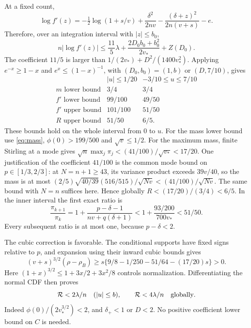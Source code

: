 \documentclass[11pt]{article}
\begin{document}
At a fixed count,
\[
\log f'(z)=-\tfrac12\log(1+s/v)+\frac{\delta^2}{2nv}
                  -\frac{(\delta+z)^2}{2n(v+s)}-e.
\]
Therefore, over an integration interval with $|z|\le b_0$,
\[
n|\log f'(z)|\le\frac{11}{5}\lambda+
             \frac{2D_0b_0+b_0^2}{2v_*}+Z(D_0).
\]
The coefficient $11/5$ is larger than
$1/(2v_*)+D^2/(1400v_*^2)$. Applying $e^{-x}\ge1-x$ and
$e^x\le(1-x)^{-1}$, with $(D_0,b_0)=(1,b)$ or $(D,7/10)$,
gives
\[
\begin{array}{c|cc}
 &|u|\le1/20&-3/10\le u\le7/10\\\hline
 m\text{ lower bound}&3/4&3/4\\
 f'\text{ lower bound}&99/100&49/50\\
 f'\text{ upper bound}&101/100&51/50\\
 R\text{ upper bound}&51/50&6/5.
\end{array}
\]
These bounds hold on the whole interval from $0$ to $u$. For the mass lower
bound use \eqref{eq:mass}, $\phi(0)>199/500$ and $\sqrt v\le1/2$.
For the maximum mass, finite Stirling at a mode gives
$\sqrt n\max_j\pi_j< (41/100)/\sqrt{v_*}<17/20$.
One justification of the coefficient $41/100$ is the common mode bound on
$p\in[1/3,2/3]$: at $N=n+1\ge43$, its variance product exceeds $39v/40$,
so the mass is at most
$(2/5)\sqrt{40/39}(516/515)/\sqrt{Nv}<(41/100)/\sqrt{Nv}$.
The same bound with $N=n$ suffices here. Hence globally
$R<(17/20)/(3/4)<6/5$.
In the inner interval the first exact ratio is
\[
 \frac{\pi_{k+1}}{\pi_k}
 =1+\frac{p-\delta-1}{nv+q(\delta+1)}
 <1+\frac{93/200}{700v_*}<51/50.
\]
Every subsequent ratio is at most one, because $p-\delta<2$.

The cubic correction is favorable. The conditional supports have fixed signs
relative to $p$, and expansion using their inward cubic bounds gives
\[
 (v+s)^{3/2}(\rho-\rho_B)
 \ge s\{9/8-1/250-51/64-(17/20)s\}>0.
\]
Here $(1+x)^{3/2}\le1+3x/2+3x^2/8$ controls normalization.
Differentiating the normal CDF then proves
\begin{equation}\label{eq:repair}
 \mathcal R<2\lambda/n\quad(|u|\le b),\qquad
 \mathcal R<4\lambda/n\quad\hbox{globally}.
\end{equation}
Indeed $\phi(0)/(2v_*^{3/2})<2$, and $\delta_+<1$ or $D<2$.
No positive coefficient lower bound on $C$ is needed.
\end{document}
